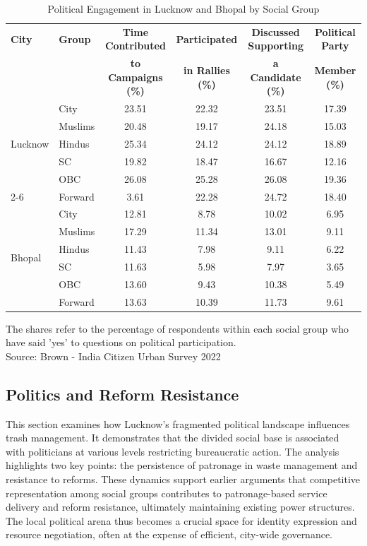 \begin{table}[ht]
\centering
\caption{Political Engagement in Lucknow and Bhopal by Social Group}
\label{tab:political_engagement}
\begin{tabular}{|l|l|c|c|c|c|}
\hline
\textbf{City} & \textbf{Group} & \textbf{Time Contributed} & \textbf{Participated} & \textbf{Discussed Supporting} & \textbf{Political Party} \\
 & & \textbf{to Campaigns (\%)} & \textbf{in Rallies (\%)} & \textbf{a Candidate (\%)} & \textbf{Member (\%)} \\
\hline
\multirow{5}{*}{Lucknow} & City & 23.51 & 22.32 & 23.51 & 17.39 \\
\cline{2-6}
 & Muslims & 20.48 & 19.17 & 24.18 & 15.03 \\
\cline{2-6}
 & Hindus & 25.34 & 24.12 & 24.12 & 18.89 \\
\cline{2-6}
 & SC & 19.82 & 18.47 & 16.67 & 12.16 \\
\cline{2-6}
 & OBC & 26.08 & 25.28 & 26.08 & 19.36 \\
\cline{2-6}
 & Forward & 3.61 & 22.28 & 24.72 & 18.40 \\
\hline
\multirow{6}{*}{Bhopal} & City & 12.81 & 8.78 & 10.02 & 6.95 \\
\cline{2-6}
 & Muslims & 17.29 & 11.34 & 13.01 & 9.11 \\
\cline{2-6}
 & Hindus & 11.43 & 7.98 & 9.11 & 6.22 \\
\cline{2-6}
 & SC & 11.63 & 5.98 & 7.97 & 3.65 \\
\cline{2-6}
 & OBC & 13.60 & 9.43 & 10.38 & 5.49 \\
\cline{2-6}
 & Forward & 13.63 & 10.39 & 11.73 & 9.61 \\
\hline
\end{tabular}
\raggedright
\small The shares refer to the percentage of respondents within each social group who have said 'yes' to questions on political participation.\\
\small Source: Brown - India Citizen Urban Survey 2022
\end{table}

\subsection{Politics and Reform Resistance}

This section examines how Lucknow's fragmented political landscape influences trash management. It demonstrates that the divided social base is associated with politicians at various levels restricting bureaucratic action. The analysis highlights two key points: the persistence of patronage in waste management and resistance to reforms. These dynamics support earlier arguments that competitive representation among social groups contributes to patronage-based service delivery and reform resistance, ultimately maintaining existing power structures. The local political arena thus becomes a crucial space for identity expression and resource negotiation, often at the expense of efficient, city-wide governance.

